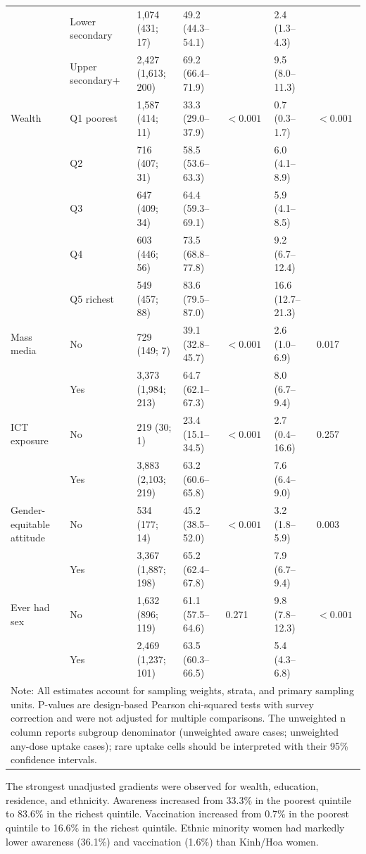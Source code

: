 \begin{longtable}{|p{1.8cm}|p{2.25cm}|p{2.0cm}|p{2.1cm}|p{0.75cm}|p{2.1cm}|p{0.75cm}|}
 & Lower secondary & 1,074 (431; 17) & 49.2 (44.3--54.1) &  & 2.4 (1.3--4.3) &  \\
 & Upper secondary+ & 2,427 (1,613; 200) & 69.2 (66.4--71.9) &  & 9.5 (8.0--11.3) &  \\
\hline
Wealth & Q1 poorest & 1,587 (414; 11) & 33.3 (29.0--37.9) & $<0.001$ & 0.7 (0.3--1.7) & $<0.001$ \\
 & Q2 & 716 (407; 31) & 58.5 (53.6--63.3) &  & 6.0 (4.1--8.9) &  \\
 & Q3 & 647 (409; 34) & 64.4 (59.3--69.1) &  & 5.9 (4.1--8.5) &  \\
 & Q4 & 603 (446; 56) & 73.5 (68.8--77.8) &  & 9.2 (6.7--12.4) &  \\
 & Q5 richest & 549 (457; 88) & 83.6 (79.5--87.0) &  & 16.6 (12.7--21.3) &  \\
\hline
Mass media & No & 729 (149; 7) & 39.1 (32.8--45.7) & $<0.001$ & 2.6 (1.0--6.9) & 0.017 \\
 & Yes & 3,373 (1,984; 213) & 64.7 (62.1--67.3) &  & 8.0 (6.7--9.4) &  \\
\hline
ICT exposure & No & 219 (30; 1) & 23.4 (15.1--34.5) & $<0.001$ & 2.7 (0.4--16.6) & 0.257 \\
 & Yes & 3,883 (2,103; 219) & 63.2 (60.6--65.8) &  & 7.6 (6.4--9.0) &  \\
\hline
Gender-equitable attitude & No & 534 (177; 14) & 45.2 (38.5--52.0) & $<0.001$ & 3.2 (1.8--5.9) & 0.003 \\
 & Yes & 3,367 (1,887; 198) & 65.2 (62.4--67.8) &  & 7.9 (6.7--9.4) &  \\
\hline
Ever had sex & No & 1,632 (896; 119) & 61.1 (57.5--64.6) & 0.271 & 9.8 (7.8--12.3) & $<0.001$ \\
 & Yes & 2,469 (1,237; 101) & 63.5 (60.3--66.5) &  & 5.4 (4.3--6.8) &  \\
\hline
\multicolumn{7}{|p{13.0cm}|}{\footnotesize Note: All estimates account for sampling weights, strata, and primary sampling units. P-values are design-based Pearson chi-squared tests with survey correction and were not adjusted for multiple comparisons. The unweighted n column reports subgroup denominator (unweighted aware cases; unweighted any-dose uptake cases); rare uptake cells should be interpreted with their 95\% confidence intervals.} \\
\hline
\end{longtable}
\endgroup

The strongest unadjusted gradients were observed for wealth, education, residence, and ethnicity. Awareness increased from 33.3\% in the poorest quintile to 83.6\% in the richest quintile. Vaccination increased from 0.7\% in the poorest quintile to 16.6\% in the richest quintile. Ethnic minority women had markedly lower awareness (36.1\%) and vaccination (1.6\%) than Kinh/Hoa women.

